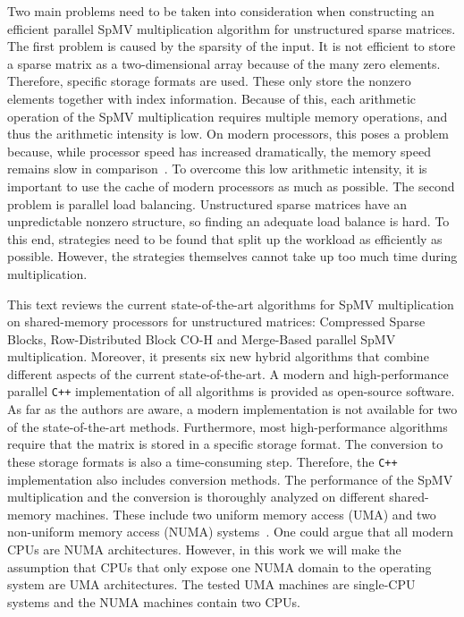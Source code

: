 \documentclass{siamart220329}
\begin{document}
Two main problems need to be taken into consideration when constructing an efficient parallel SpMV multiplication algorithm for unstructured sparse matrices. The first problem is caused by the sparsity of the input. It is not efficient to store a sparse matrix as a two-dimensional array because of the many zero elements. Therefore, specific storage formats are used. These only store the nonzero elements together with index information. Because of this, each arithmetic operation of the SpMV multiplication requires multiple memory operations, and thus the arithmetic intensity is low. On modern processors, this poses a problem because, while processor speed has increased dramatically, the memory speed remains slow in comparison~\cite{comporg-design}. To overcome this low arithmetic intensity, it is important to use the cache of modern processors as much as possible. The second problem is parallel load balancing. Unstructured sparse matrices have an unpredictable nonzero structure, so finding an adequate load balance is hard. To this end, strategies need to be found that split up the workload as efficiently as possible. However, the strategies themselves cannot take up too much time during multiplication.

This text reviews the current state-of-the-art algorithms for SpMV multiplication on shared-memory processors for unstructured matrices: Compressed Sparse Blocks, Row-Distributed Block CO-H and Merge-Based parallel SpMV multiplication. Moreover, it presents six new hybrid algorithms that combine different aspects of the current state-of-the-art. A modern and high-performance parallel \texttt{C++} implementation of all algorithms is provided as open-source software. As far as the authors are aware, a modern implementation is not available for two of the state-of-the-art methods. Furthermore, most high-performance algorithms require that the matrix is stored in a specific storage format. The conversion to these storage formats is also a time-consuming step. Therefore, the \texttt{C++} implementation also includes conversion methods. The performance of the SpMV multiplication and the conversion is thoroughly analyzed on different shared-memory machines. These include two uniform memory access (UMA) and two non-uniform memory access (NUMA) systems~\cite{comporg-design}. One could argue that all modern CPUs are NUMA architectures. However, in this work we will make the assumption that CPUs that only expose one NUMA domain to the operating system are UMA architectures. The tested UMA machines are single-CPU systems and the NUMA machines contain two CPUs.
\end{document}
